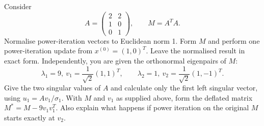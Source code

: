 \documentclass[10pt,a4paper,twocolumn]{article}
\begin{document}
Consider
\[
A=\begin{pmatrix}2&2\\1&0\\0&1\end{pmatrix},\qquad M=A^TA.
\]
Normalise power-iteration vectors to Euclidean norm 1.
 Form $M$ and perform one power-iteration update from $x^{(0)}=(1,0)^T$. Leave the normalised result in exact form.
 Independently, you are given the orthonormal eigenpairs of $M$:
\[
\lambda_1=9,\ v_1=\frac{1}{\sqrt2}(1,1)^T,\qquad
\lambda_2=1,\ v_2=\frac{1}{\sqrt2}(1,-1)^T.
\]
Give the two singular values of $A$ and calculate only the first left singular vector, using $u_1=Av_1/\sigma_1$.
 With $M$ and $v_1$ as supplied above, form the deflated matrix $M^*=M-9v_1v_1^T$. Also explain what happens if power iteration on the original $M$ starts exactly at $v_2$.
\end{document}
